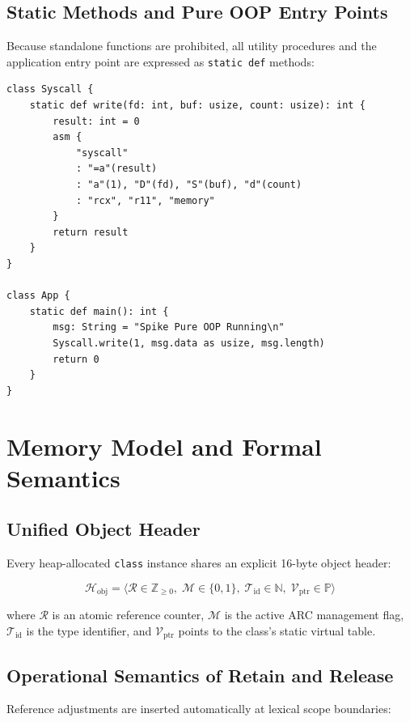 \documentclass[10pt,twocolumn]{article}
\begin{document}
\subsection{Static Methods and Pure OOP Entry Points}
Because standalone functions are prohibited, all utility procedures and the application entry point are expressed as \texttt{static def} methods:

\begin{lstlisting}[caption={Static Method Encapsulation and System Calls}]
class Syscall {
    static def write(fd: int, buf: usize, count: usize): int {
        result: int = 0
        asm {
            "syscall"
            : "=a"(result)
            : "a"(1), "D"(fd), "S"(buf), "d"(count)
            : "rcx", "r11", "memory"
        }
        return result
    }
}

class App {
    static def main(): int {
        msg: String = "Spike Pure OOP Running\n"
        Syscall.write(1, msg.data as usize, msg.length)
        return 0
    }
}
\end{lstlisting}

\section{Memory Model and Formal Semantics}

\subsection{Unified Object Header}
Every heap-allocated \texttt{class} instance shares an explicit 16-byte object header:

\begin{equation}
\mathcal{H}_{\text{obj}} = \langle \mathcal{R} \in \mathbb{Z}_{\ge 0}, \; \mathcal{M} \in \{0, 1\}, \; \mathcal{T}_{\text{id}} \in \mathbb{N}, \; \mathcal{V}_{\text{ptr}} \in \mathbb{P} \rangle
\end{equation}

where $\mathcal{R}$ is an atomic reference counter, $\mathcal{M}$ is the active ARC management flag, $\mathcal{T}_{\text{id}}$ is the type identifier, and $\mathcal{V}_{\text{ptr}}$ points to the class's static virtual table.

\subsection{Operational Semantics of Retain and Release}
Reference adjustments are inserted automatically at lexical scope boundaries:
\end{document}
